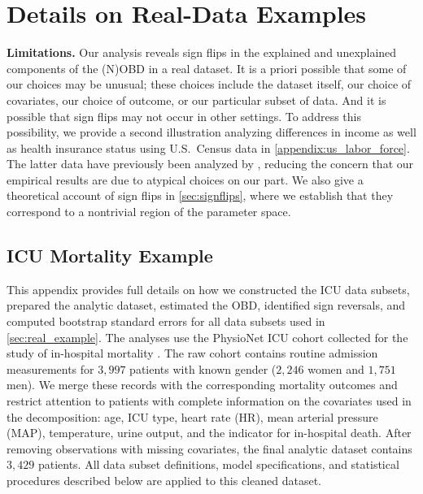 \section{Details on Real-Data Examples}
\label{appendix:real_data}


\textbf{Limitations.}
Our analysis reveals sign flips in the explained and unexplained components of the (N)OBD in a real dataset.
It is a priori possible that some of our choices may be unusual; these choices include the dataset itself, our choice of covariates, our choice of outcome, or our particular subset of data. And it is possible that sign flips may not occur in other settings.
To address this possibility, we provide a second illustration analyzing differences in income as well as health insurance status using U.S.\ Census data in \cref{appendix:us_labor_force}.
The latter data have previously been analyzed by \citet{bach2024heterogeneity}, reducing the concern that our empirical results are due to atypical choices on our part.
We also give a theoretical account of sign flips in \cref{sec:signflips}, where we establish that they correspond to a nontrivial region of the parameter space.

\subsection{ICU Mortality Example}
\label{appendix:icu_details}

This appendix provides full details on how we constructed the ICU data subsets, prepared the analytic dataset, estimated the OBD, identified sign reversals, and computed bootstrap standard errors for all data subsets used in \cref{sec:real_example}. The analyses use the PhysioNet ICU cohort collected for the study of in-hospital mortality \citep{goldberger2000physiobank}. The raw cohort contains routine admission measurements for $3,997$ patients with known gender ($2,246$ women and $1,751$ men). We merge these records with the corresponding mortality outcomes and restrict attention to patients with complete information on the covariates used in the decomposition: age, ICU type, heart rate (HR), mean arterial pressure (MAP), temperature, urine output, and the indicator for in-hospital death. After removing observations with missing covariates, the final analytic dataset contains $3,429$ patients. All data subset definitions, model specifications, and statistical procedures described below are applied to this cleaned dataset.

